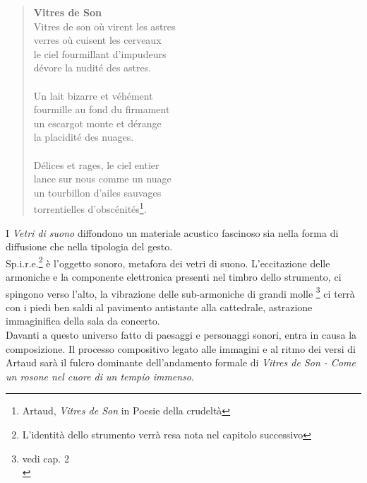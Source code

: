 \begin{quotation}
{\sf \textbf{Vitres de Son} \\
Vitres de son où virent les astres \\
verres où cuisent les cerveaux \\
le ciel fourmillant d'impudeurs \\
dévore la nudité des astres. \\ \\
Un lait bizarre et véhément \\
fourmille au fond du firmament \\
un escargot monte et dérange \\
la placidité des nuages. \\ \\
Délices et rages, le ciel entier \\
lance sur nous comme un nuage \\
un tourbillon d'ailes sauvages \\
torrentielles d'obscénités\footnote{Artaud, \textit{Vitres de Son} in Poesie della crudeltà}.}
\end{quotation}

I \textit{Vetri di suono} diffondono un materiale acustico fascinoso sia nella forma di diffusione che nella tipologia del gesto. \\
Sp.i.r.e.\footnote{L'identità dello strumento verrà resa nota nel capitolo successivo} è l'oggetto sonoro, metafora dei vetri di suono. L'eccitazione delle armoniche e la componente elettronica presenti nel timbro dello strumento, ci spingono verso l'alto, la vibrazione delle sub-armoniche di grandi molle \footnote{vedi cap. 2 \\} ci terrà con i piedi ben saldi al pavimento antistante alla cattedrale, astrazione immaginifica della sala da concerto. \\
Davanti a questo universo fatto di paesaggi e personaggi sonori, entra in causa la composizione. Il processo compositivo legato alle immagini e al ritmo dei versi di Artaud sarà il fulcro dominante dell'andamento formale di \textit{Vitres de Son - Come un rosone nel cuore di un tempio immenso}.
